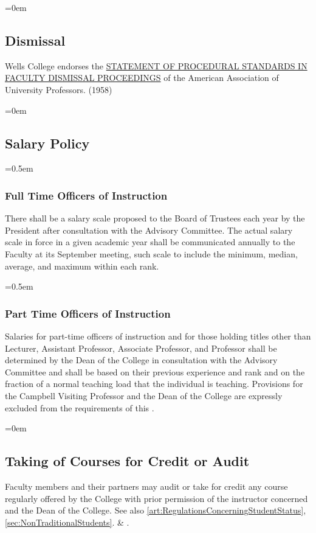 \documentclass{manual}
\let\oldsubsection\subsection
\renewcommand\subsection{\leftskip=0em\oldsubsection}
\let\oldsubsubsection\subsubsection
\renewcommand\subsubsection{\leftskip=0.5em\oldsubsubsection}
\begin{document}
\subsection{Dismissal}\label{sec:Dismissal}
Wells College endorses the \href{http://www.aaup.org/AAUP/pubsres/policydocs/contents/statementon+proceduralstandardsinfaculty+dismissal+proceedings.htm}{STATEMENT OF PROCEDURAL STANDARDS IN FACULTY DISMISSAL PROCEEDINGS} of the American Association of University Professors. (1958)

\subsection{Salary Policy}\label{sec:SalaryPolicy}

\subsubsection{Full Time Officers of Instruction}
There shall be a salary scale proposed to the Board of Trustees each year by the President after consultation with the Advisory Committee.
The actual salary scale in force in a given academic year shall be communicated annually to the Faculty at its September meeting, such scale to include the minimum, median, average, and maximum within each rank.

\subsubsection{Part Time Officers of Instruction}
Salaries for part-time officers of instruction and for those holding titles other than Lecturer, Assistant Professor, Associate Professor, and Professor shall be determined by the Dean of the College in consultation with the Advisory Committee and shall be based on their previous experience and rank and on the fraction of a normal teaching load that the individual is teaching. Provisions for the Campbell Visiting Professor and the Dean of the College are expressly excluded from the requirements of this .

\subsection{Taking of Courses for Credit or Audit}
Faculty members and their partners may audit or take for credit any course regularly offered by the College with prior permission of the instructor concerned and the Dean of the College. See also \cref{art:RegulationsConcerningStudentStatus}, \cref{sec:NonTraditionalStudents}.  \& .
\end{document}

